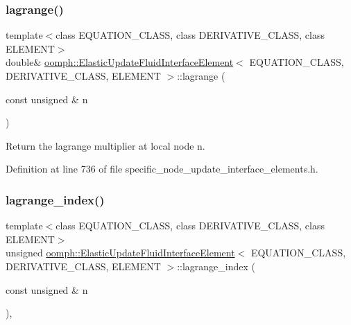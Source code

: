 \subsubsection{\texorpdfstring{lagrange()}{lagrange()}}
{\footnotesize\ttfamily template$<$class E\+Q\+U\+A\+T\+I\+O\+N\+\_\+\+C\+L\+A\+SS, class D\+E\+R\+I\+V\+A\+T\+I\+V\+E\+\_\+\+C\+L\+A\+SS, class E\+L\+E\+M\+E\+NT$>$ \\
double\& \hyperlink{classoomph_1_1ElasticUpdateFluidInterfaceElement}{oomph\+::\+Elastic\+Update\+Fluid\+Interface\+Element}$<$ E\+Q\+U\+A\+T\+I\+O\+N\+\_\+\+C\+L\+A\+SS, D\+E\+R\+I\+V\+A\+T\+I\+V\+E\+\_\+\+C\+L\+A\+SS, E\+L\+E\+M\+E\+NT $>$\+::lagrange (\begin{DoxyParamCaption}\item[{const unsigned \&}]{n }\end{DoxyParamCaption})\hspace{0.3cm}{\ttfamily [inline]}}



Return the lagrange multiplier at local node n. 



Definition at line 736 of file specific\+\_\+node\+\_\+update\+\_\+interface\+\_\+elements.\+h.

\mbox{\label{classoomph_1_1ElasticUpdateFluidInterfaceElement_a2eb4fbe50ac4ff1e9b26e0e1d8ff3186}} 
\subsubsection{\texorpdfstring{lagrange\+\_\+index()}{lagrange\_index()}}
{\footnotesize\ttfamily template$<$class E\+Q\+U\+A\+T\+I\+O\+N\+\_\+\+C\+L\+A\+SS, class D\+E\+R\+I\+V\+A\+T\+I\+V\+E\+\_\+\+C\+L\+A\+SS, class E\+L\+E\+M\+E\+NT$>$ \\
unsigned \hyperlink{classoomph_1_1ElasticUpdateFluidInterfaceElement}{oomph\+::\+Elastic\+Update\+Fluid\+Interface\+Element}$<$ E\+Q\+U\+A\+T\+I\+O\+N\+\_\+\+C\+L\+A\+SS, D\+E\+R\+I\+V\+A\+T\+I\+V\+E\+\_\+\+C\+L\+A\+SS, E\+L\+E\+M\+E\+NT $>$\+::lagrange\+\_\+index (\begin{DoxyParamCaption}\item[{const unsigned \&}]{n }\end{DoxyParamCaption})\hspace{0.3cm}{\ttfamily [inline]}, {\ttfamily [private]}}



